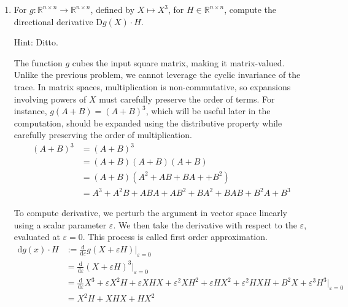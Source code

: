 \documentclass{article}
\begin{document}
\begin{enumerate}[start=9]
  \item For $g:\mathbb{R}^{n\times n}\rightarrow\mathbb{R}^{n\times n}$, defined by $X\mapsto X^{3}$, for $H\in\mathbb{R}^{n\times n}$, compute the directional derivative D$g(X)\cdot H$.

  {\footnotesize Hint: Ditto.}

  \begin{ans_box}
    The function $g$ cubes the input square matrix, making it matrix-valued. Unlike the previous problem, we cannot leverage the cyclic invariance of the trace. In matrix spaces, multiplication is non-commutative, so expansions involving powers of $X$ must carefully preserve the order of terms. For instance, $g(A+B)=(A+B)^{3}$, which will be useful later in the computation, should be expanded using the distributive property while carefully preserving the order of multiplication.\medskip
    \begin{equation*}
      \begin{split}
        \label{eqn:12a}
        (A+B)^{3}&=(A+B)^{3}\\
        &=(A+B)(A+B)(A+B)\\
        &=(A+B)(A^{2}+AB+BA++B^{2})\\
        &=A^{3}+A^{2}B+ABA+AB^{2}+BA^{2}+BAB+B^{2}A+B^{3}
      \end{split}
    \end{equation*}

    To compute derivative, we perturb the argument in vector space linearly using a scalar parameter $\varepsilon$. We then take the derivative with respect to the $\varepsilon$, evaluated at $\varepsilon=0$. This process is called first order approximation.
  \begin{equation*}
    \begin{split}
      \text{d}g(x)\cdot H&:=\frac{\text{d}}{\text{d}\varepsilon}g(X+\varepsilon H)\bigg|_{\varepsilon=0}\\
      &=\frac{\text{d}}{\text{d}\varepsilon}(X+\varepsilon H)^{3}\bigg|_{\varepsilon=0}\\
      &=\frac{\text{d}}{\text{d}\varepsilon}X^{3}+\varepsilon X^{2}H+\varepsilon XHX+\varepsilon^{2} XH^{2}+
      \varepsilon HX^{2}+\varepsilon^{2}HXH+B^{2}X+\varepsilon^{3}H^{3}\bigg|_{\varepsilon=0}\\
      &=X^{2}H+XHX+HX^{2}
    \end{split}
  \end{equation*}
  \end{ans_box}


\end{enumerate}
\end{document}
